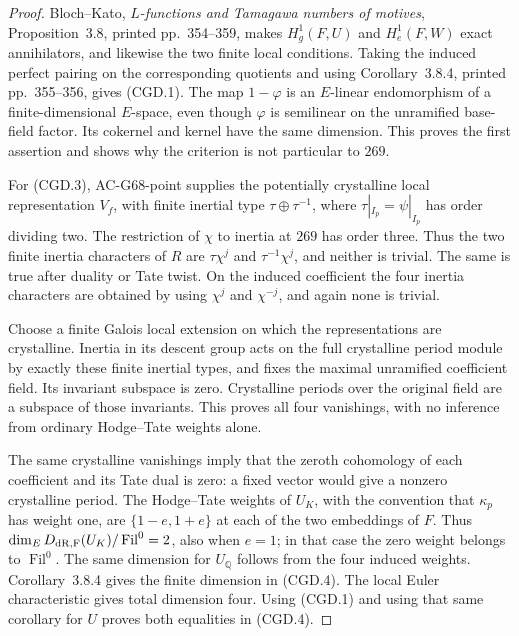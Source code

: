 \begin{proof}
Bloch--Kato, \emph{\(L\)-functions and Tamagawa numbers of
motives}, Proposition~3.8, printed pp.~354--359, makes
\(H_g^1(F,U)\) and \(H_e^1(F,W)\) exact annihilators,
and likewise the two finite local conditions. Taking the
induced perfect pairing on the corresponding quotients and
using Corollary~3.8.4, printed pp.~355--356, gives (CGD.1).
The map \(1-\varphi\) is an \(E\)-linear endomorphism
of a finite-dimensional \(E\)-space, even though
\(\varphi\) is semilinear on the unramified base-field
factor. Its cokernel and kernel have the same dimension.
This proves the first assertion and shows why the criterion
is not particular to \(269\).

For (CGD.3), AC-G68-point supplies the potentially crystalline
local representation \(V_f\), with finite inertial type
\(\tau\oplus\tau^{-1}\), where
\(\tau|_{I_p}=\psi|_{I_p}\) has order dividing two.
The restriction of \(\chi\) to inertia at \(269\) has
order three. Thus the two finite inertia characters of
\(R\) are \(\tau\chi^j\) and \(\tau^{-1}\chi^j\),
and neither is trivial. The same is true after duality or
Tate twist. On the induced coefficient the four inertia
characters are obtained by using \(\chi^j\) and
\(\chi^{-j}\), and again none is trivial.

Choose a finite Galois local extension on which the
representations are crystalline. Inertia in its descent
group acts on the full crystalline period module by exactly
these finite inertial types, and fixes the maximal unramified
coefficient field. Its invariant subspace is zero.
Crystalline periods over the original field are a subspace
of those invariants. This proves all four vanishings, with
no inference from ordinary Hodge--Tate weights alone.

The same crystalline vanishings imply that the zeroth
cohomology of each coefficient and its Tate dual is zero:
a fixed vector would give a nonzero crystalline period.
The Hodge--Tate weights of \(U_K\), with the convention
that \(\kappa_p\) has weight one, are
\(\{1-e,1+e\}\) at each of the two embeddings of \(F\).
Thus \(\dim_E D_{\rm dR,F}(U_K)/\operatorname{Fil}^0=2\),
also when \(e=1\); in that case the zero weight belongs
to \(\operatorname{Fil}^0\). The same dimension for
\(U_{\mathbb Q}\) follows from the four induced weights.
Corollary~3.8.4 gives the finite dimension in (CGD.4).
The local Euler characteristic gives total dimension four.
Using (CGD.1) and using that same corollary for \(U\)
proves both equalities in (CGD.4).


\end{proof}
